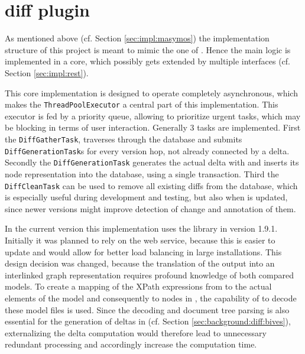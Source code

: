 	\begin{comment}
	\begin{itemize}
		\item generic ontology import for COMODI
		\item some helper methods/functions
	\end{itemize}
	\end{comment}

\section{\masymos diff plugin}
	\label{sec:impl:diff}
	As mentioned above (cf. Section \ref{sec:impl:masymos}) the implementation structure of this project is meant to mimic the one of \masymos. Hence the main logic is implemented in a core, which possibly gets extended by multiple interfaces (cf. Section \ref{sec:impl:rest}).
	
	This core implementation is designed to operate completely asynchronous, which makes the \texttt{ThreadPoolExecutor} a central part of this implementation. This executor is fed by a priority queue, allowing to prioritize urgent tasks, which may be blocking in terms of user interaction.
	Generally 3 tasks are implemented. First the \texttt{DiffGatherTask}, traverses through the database and submits \texttt{DiffGenerationTask}s for every version hop, not already connected by a delta.
	Secondly the \texttt{DiffGenerationTask} generates the actual delta with \bives and inserts its node representation into the database, using a single transaction.
	Third the \texttt{DiffCleanTask} can be used to remove all existing diffs from the database, which is especially useful during development and testing, but also when \bives is updated, since newer versions might improve detection of  change and annotation of them.
	
	In the current version this implementation uses the \bives library in version 1.9.1. Initially it was planned to rely on the \bives web service, because this is easier to update and would allow for better load balancing in large installations.
	This design decision was changed, because the translation of the \bives \xml output into an interlinked graph representation requires profound knowledge of both compared models. To create a mapping of the XPath expressions from \bives to the actual \xml elements of the model and consequently to nodes in \masymos, the capability of \bives to decode these model files is used. Since the decoding and document tree parsing is also essential for the generation of deltas in \bives (cf. Section \ref{sec:background:diff:bives}), externalizing the delta computation would therefore lead to unnecessary redundant processing and accordingly increase the computation time.
	
